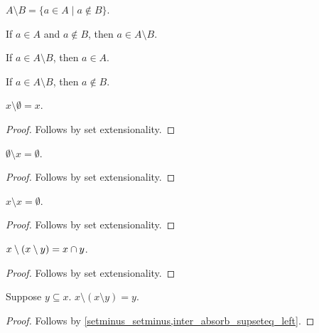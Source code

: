 \begin{definition}\label{setminus}
    $A\setminus B = \{ a \in A \mid a\not\in B\}$.
\end{definition}

\begin{proposition}\label{setminus_intro}
    If $a\in A$ and $a\notin B$, then $a\in A\setminus B$.
\end{proposition}

\begin{proposition}\label{setminus_elim_left}
    If $a\in A\setminus B$, then $a\in A$.
\end{proposition}

\begin{proposition}\label{setminus_elim_right}
    If $a\in A\setminus B$, then $a\notin B$.
\end{proposition}

\begin{proposition}\label{setminus_emptyset}
    $x\setminus \emptyset = x$.
\end{proposition}
\begin{proof}
    Follows by set extensionality.
\end{proof}

\begin{proposition}\label{emptyset_setminus}
    $\emptyset\setminus x = \emptyset$.
\end{proposition}
\begin{proof}
    Follows by set extensionality.
\end{proof}

\begin{proposition}\label{setminus_self}
    $x\setminus x = \emptyset$.
\end{proposition}
\begin{proof}
    Follows by set extensionality.
\end{proof}

\begin{proposition}\label{setminus_setminus}
    $x\setminus (x\setminus y) = x\cap y$.
\end{proposition}
\begin{proof}
    Follows by set extensionality.
\end{proof}

\begin{proposition}\label{double_relative_complement}
    Suppose $y\subseteq x$.
    $x\setminus (x\setminus y) = y$.
\end{proposition}
\begin{proof}
    Follows by \cref{setminus_setminus,inter_absorb_supseteq_left}.
\end{proof}


